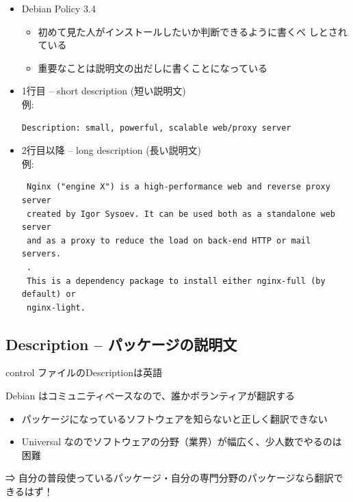 \documentclass[mingoth,a4paper]{jsarticle}
\begin{document}
  \begin{itemize}

   \item Debian Policy 3.4
	 \begin{itemize}
	  \item 初めて見た人がインストールしたいか判断できるように書くべ
		しとされている
	  \item 重要なことは説明文の出だしに書くことになっている
	 \end{itemize}

 \item 1行目 -- short description (短い説明文)\\
       例:\\
       {
  \scriptsize
\begin{verbatim}
Description: small, powerful, scalable web/proxy server
\end{verbatim}
}
 \item 2行目以降 -- long description (長い説明文)\\
       例:\\
  \scriptsize
\begin{verbatim}
 Nginx ("engine X") is a high-performance web and reverse proxy server
 created by Igor Sysoev. It can be used both as a standalone web server
 and as a proxy to reduce the load on back-end HTTP or mail servers.
 .
 This is a dependency package to install either nginx-full (by default) or
 nginx-light.
\end{verbatim}
  \end{itemize}

\subsection{Description -- パッケージの説明文}
   control ファイルのDescriptionは英語

   Debian はコミュニティベースなので、誰かボランティアが翻訳する


   \begin{itemize}
    \item パッケージになっているソフトウェアを知らないと正しく翻訳できない
    \item Universal なのでソフトウェアの分野（業界）が幅広く、少人数でやるのは困難
   \end{itemize}
   ⇒ 自分の普段使っているパッケージ・自分の専門分野のパッケージなら翻訳できるはず！
\end{document}
